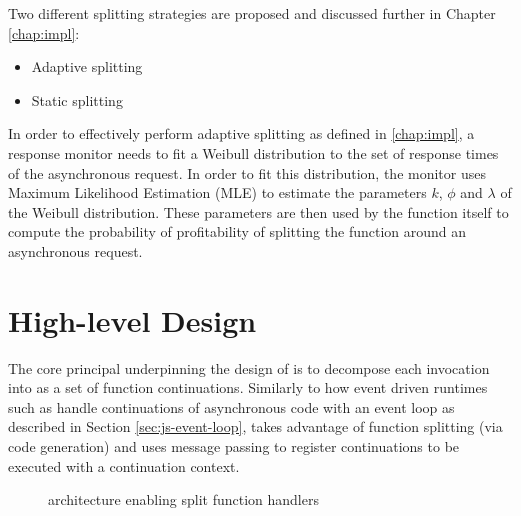 Two different splitting strategies are proposed and discussed further in Chapter \ref{chap:impl}:

\begin{itemize}
    \item Adaptive splitting
    \item Static splitting
\end{itemize}


In order to effectively perform adaptive splitting as defined in \ref{chap:impl}, a response monitor needs to fit a Weibull distribution to the set of response times of the asynchronous request. In order to fit this distribution, the monitor uses Maximum Likelihood Estimation (MLE) to estimate the parameters $k$, $\phi$ and $\lambda$ of the Weibull distribution. These parameters are then used by the function itself to compute the probability of profitability of splitting the function around an asynchronous request.

\section{High-level Design}
The core principal underpinning the design of \faaas{} is to decompose each \faas{} invocation into as a set of function continuations. Similarly to how event driven runtimes such as \js{} handle continuations of asynchronous code with an event loop as described in Section \ref{sec:js-event-loop}, \faaas{} takes advantage of function splitting (via code generation) and uses message passing to register continuations to be executed with a continuation context.

\begin{figure}[htp]
    \centering
    \quad
    \caption{\faas{} architecture enabling split function handlers}
\end{figure}

